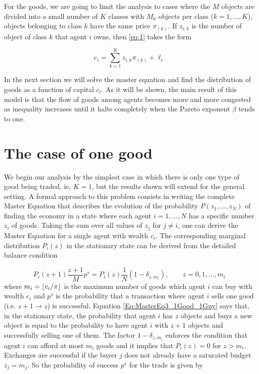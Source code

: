 For the goods, we are going to limit the analysis to cases where the $M$ objects are divided into a small number of $K$ classes with $M_k$ objects per class ($k=1,\ldots,K$), objects belonging to class $k$ have the same price $\pi_{(k)}$. If $z_{i,k}$ is the number of object of class $k$ that agent $i$ owns, then \eqref{eq:1} takes the form

\begin{equation}
c_i =  \sum_{k=1}^K z_{i , k} \pi_{(k)} + \ell_i
\end{equation}

In the next section we will solve the master equation and find the distribution of goods as a function of capital $c_i$. As it will be shown, the main result of this model is that the flow of goods among agents becomes more and more congested as inequality increases until it halts completely when the Pareto exponent $\beta$ tends to one.


\section{The case of one good}

We begin our analysis by the simplest case in which there is only one type of good being traded, ie, $K=1$, but the results shown will extend for the general setting. A formal approach to this problem consists in writing the complete Master Equation that describes the evolution of the probability $P(z_1,\ldots, z_N)$ of finding the economy in a state where each agent $i=1,\ldots,N$ has a specific number $z_i$ of goods. Taking the sum over all values of $z_j$ for $j\neq i$, one can derive the Master Equation for a single agent with wealth $c_i$. The corresponding marginal distribution $P_i(z)$ in the stationary state can be derived from the detailed balance condition

\begin{equation}
P_i(z+1)  \frac{z+1}{M}  p^s =  P_i(z) \frac{1}{N} \left(1-\delta_{z, m_{i}}\right) ,\qquad z=0,1,\ldots, m_i
\label{Eq:MasterEq3_1Good_1Guy}
\end{equation}
where $m_{i}=\lfloor c_i / \pi\rfloor$ is the maximum number of goods which agent $i$ can buy with wealth $c_i$ and $p^{s}$ is the probability that a transaction where agent $i$ sells one good (i.e. $z+1\to z$) is successful. Equation \eqref{Eq:MasterEq3_1Good_1Guy} says that, in the stationary state, the probability that agent $i$ has $z$ objects and buys a new object is equal to the probability to have agent $i$ with $z+1$ objects and successfully selling one of them. The factor $1-\delta_{z, m_{i}}$ enforces the condition that agent $i$ can afford at most $m_i$ goods and it implies that $P_i(z)=0$ for $z>m_i$. Exchanges are successful if the buyer $j$ does not already have a saturated budget $z_j=m_j$. So the probability of success $p^s$ for the trade is given by


